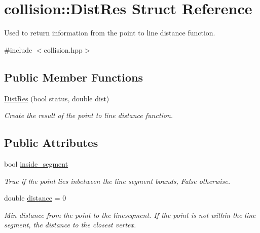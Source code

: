 \hypertarget{structcollision_1_1DistRes}{}\section{collision\+:\+:Dist\+Res Struct Reference}
\label{structcollision_1_1DistRes}


Used to return information from the point to line distance function.  




{\ttfamily \#include $<$collision.\+hpp$>$}

\subsection*{Public Member Functions}
\begin{DoxyCompactItemize}
\item 
\hyperlink{structcollision_1_1DistRes_a1275e0b506edcd9aa0cdaa72a61d1ae7}{Dist\+Res} (bool status, double dist)
\begin{DoxyCompactList}\small\item\em Create the result of the point to line distance function. \end{DoxyCompactList}\end{DoxyCompactItemize}
\subsection*{Public Attributes}
\begin{DoxyCompactItemize}
\item 
\mbox{\label{structcollision_1_1DistRes_a9da4071fdc224d798adb12dcb1cfff58}} 
bool \hyperlink{structcollision_1_1DistRes_a9da4071fdc224d798adb12dcb1cfff58}{inside\+\_\+segment}
\begin{DoxyCompactList}\small\item\em True if the point lies inbetween the line segment bounds, False otherwise. \end{DoxyCompactList}\item 
\mbox{\label{structcollision_1_1DistRes_a11d43615b27de89a62ef53a2075f72ee}} 
double \hyperlink{structcollision_1_1DistRes_a11d43615b27de89a62ef53a2075f72ee}{distance} = 0
\begin{DoxyCompactList}\small\item\em Min distance from the point to the linesegment. If the point is not within the line segment, the distance to the closest vertex. \end{DoxyCompactList}\end{DoxyCompactItemize}


